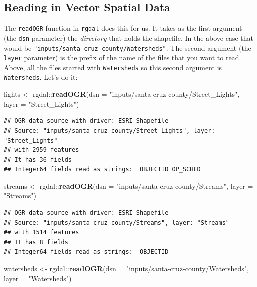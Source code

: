 \documentclass[]{book}
\newenvironment{Shaded}{\begin{snugshade}}{\end{snugshade}}
\newcommand{\KeywordTok}[1]{\textcolor[rgb]{0.13,0.29,0.53}{\textbf{{#1}}}}
\newcommand{\DataTypeTok}[1]{\textcolor[rgb]{0.13,0.29,0.53}{{#1}}}
\newcommand{\StringTok}[1]{\textcolor[rgb]{0.31,0.60,0.02}{{#1}}}
\newcommand{\NormalTok}[1]{{#1}}
\theoremstyle{definition}
\theoremstyle{definition}
\theoremstyle{remark}
\begin{document}
\subsection{Reading in Vector Spatial
Data}\label{reading-in-vector-spatial-data}

The \texttt{readOGR} function in \texttt{rgdal} does this for us. It
takes as the first argument (the \texttt{dsn} parameter) the
\emph{directory} that holds the shapefile. In the above case that would
be \texttt{"inputs/santa-cruz-county/Watersheds"}. The second argument
(the \texttt{layer} parameter) is the prefix of the name of the files
that you want to read. Above, all the files started with
\texttt{Watersheds} so this second argument is \texttt{Watersheds}.
Let's do it:

\begin{Shaded}
\begin{Highlighting}[]
\NormalTok{lights <-}\StringTok{ }\NormalTok{rgdal::}\KeywordTok{readOGR}\NormalTok{(}\DataTypeTok{dsn =} \StringTok{"inputs/santa-cruz-county/Street_Lights"}\NormalTok{, }\DataTypeTok{layer =} \StringTok{"Street_Lights"}\NormalTok{)}
\end{Highlighting}
\end{Shaded}

\begin{verbatim}
## OGR data source with driver: ESRI Shapefile 
## Source: "inputs/santa-cruz-county/Street_Lights", layer: "Street_Lights"
## with 2959 features
## It has 36 fields
## Integer64 fields read as strings:  OBJECTID OP_SCHED
\end{verbatim}

\begin{Shaded}
\begin{Highlighting}[]
\NormalTok{streams <-}\StringTok{ }\NormalTok{rgdal::}\KeywordTok{readOGR}\NormalTok{(}\DataTypeTok{dsn =} \StringTok{"inputs/santa-cruz-county/Streams"}\NormalTok{, }\DataTypeTok{layer =} \StringTok{"Streams"}\NormalTok{)}
\end{Highlighting}
\end{Shaded}

\begin{verbatim}
## OGR data source with driver: ESRI Shapefile 
## Source: "inputs/santa-cruz-county/Streams", layer: "Streams"
## with 1514 features
## It has 8 fields
## Integer64 fields read as strings:  OBJECTID
\end{verbatim}

\begin{Shaded}
\begin{Highlighting}[]
\NormalTok{watersheds <-}\StringTok{ }\NormalTok{rgdal::}\KeywordTok{readOGR}\NormalTok{(}\DataTypeTok{dsn =} \StringTok{"inputs/santa-cruz-county/Watersheds"}\NormalTok{, }\DataTypeTok{layer =} \StringTok{"Watersheds"}\NormalTok{)}
\end{Highlighting}
\end{Shaded}
\end{document}
